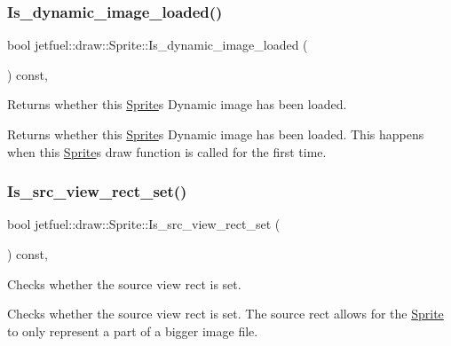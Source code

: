 \subsubsection{\texorpdfstring{Is\+\_\+dynamic\+\_\+image\+\_\+loaded()}{Is\_dynamic\_image\_loaded()}}
{\footnotesize\ttfamily bool jetfuel\+::draw\+::\+Sprite\+::\+Is\+\_\+dynamic\+\_\+image\+\_\+loaded (\begin{DoxyParamCaption}{ }\end{DoxyParamCaption}) const\hspace{0.3cm}{\ttfamily [inline]}, {\ttfamily [protected]}}



Returns whether this \hyperlink{classjetfuel_1_1draw_1_1Sprite}{Sprite}\textquotesingle{}s Dynamic image has been loaded. 

Returns whether this \hyperlink{classjetfuel_1_1draw_1_1Sprite}{Sprite}\textquotesingle{}s Dynamic image has been loaded. This happens when this \hyperlink{classjetfuel_1_1draw_1_1Sprite}{Sprite}\textquotesingle{}s draw function is called for the first time. \mbox{\label{classjetfuel_1_1draw_1_1Sprite_a31b6b5ee62f3298577bbf78ad7b18cdf}} 
\subsubsection{\texorpdfstring{Is\+\_\+src\+\_\+view\+\_\+rect\+\_\+set()}{Is\_src\_view\_rect\_set()}}
{\footnotesize\ttfamily bool jetfuel\+::draw\+::\+Sprite\+::\+Is\+\_\+src\+\_\+view\+\_\+rect\+\_\+set (\begin{DoxyParamCaption}{ }\end{DoxyParamCaption}) const\hspace{0.3cm}{\ttfamily [inline]}, {\ttfamily [protected]}}



Checks whether the source view rect is set. 

Checks whether the source view rect is set. The source rect allows for the \hyperlink{classjetfuel_1_1draw_1_1Sprite}{Sprite} to only represent a part of a bigger image file. \mbox{\label{classjetfuel_1_1draw_1_1Sprite_a370d0b3b2770348ae57ae5156c59a0ca}} 
